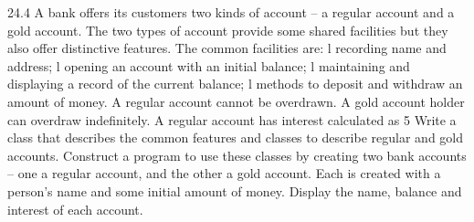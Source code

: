 24.4	A bank offers its customers two kinds of account – a regular account and a gold account. The two types of account provide some shared facilities but they also offer distinctive features. The common facilities are:
l	recording name and address;
l	opening an account with an initial balance;
l	maintaining and displaying a record of the current balance;
l	methods to deposit and withdraw an amount of money.
	A regular account cannot be overdrawn. A gold account holder can overdraw indeﬁnitely. A regular account has interest calculated as 5%
Write a class that describes the common features and classes to describe regular and gold accounts.
Construct a program to use these classes by creating two bank accounts – one a regular account, and the other a gold account. Each is created with a person’s name and some initial amount of money. Display the name, balance and interest of each account.


